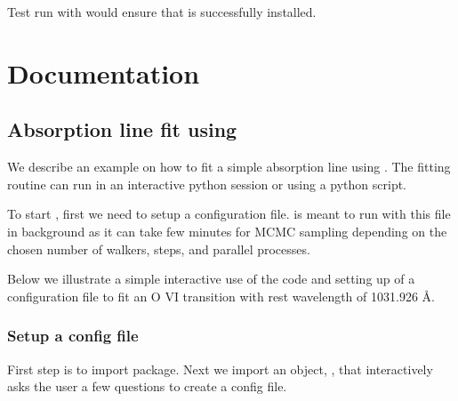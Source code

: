\documentclass[a4paper,11pt,english]{sphinxmanual}
\begin{document}
Test run with  would ensure that  is successfully installed.


\chapter{Documentation}
\label{\detokenize{index:documentation}}

\section{Absorption line fit using }
\label{\detokenize{documentation:absorption-line-fit-using-bayesvp}}\label{\detokenize{documentation:documentation}}\label{\detokenize{documentation::doc}}
We describe an example on how to fit a simple absorption line using .  The fitting routine can run in an interactive python session or using a python script.

To start , first we need to setup a configuration file.  is meant to run with this file in background as it can take few minutes for MCMC sampling depending on the chosen number of walkers, steps, and parallel processes.

Below we illustrate a simple interactive use of the code and setting up of a configuration file to fit an O VI transition with rest wavelength of 1031.926 Å.


\subsection{Setup a config file}
\label{\detokenize{documentation:setup-a-config-file}}
First step is to import  package. Next we import an object, , that interactively asks the user a few questions
to create a config file.

%
\begin{sphinxVerbatim}[commandchars=\\\{\}]
 \PYG{p}{[}\PYG{p}{]}  

 \PYG{p}{[}\PYG{p}{]}      
\end{sphinxVerbatim}
\end{document}
